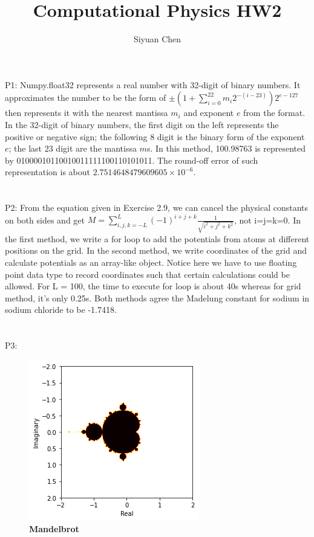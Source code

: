 \documentclass[11pt]{article}
\title{Computational Physics HW2}
\author{Siyuan Chen}
\begin{document}
\maketitle

\section*{}
P1:
Numpy.float32 represents a real number with 32-digit of binary numbers. It approximates the number to be the form of $\pm(1+\sum\limits^{22}_{i=0}m_i2^{-(i-23)})2^{e-127}$ then represents it with the nearest mantissa $m_i$ and exponent $e$ from the format. In the 32-digit of binary numbers, the first digit on the left represents the positive or negative sign; the following 8 digit is the binary form of the exponent $e$; the last 23 digit are the mantissa $m$s. In this method, 100.98763 is represented by 01000010110010011111100110101011. The round-off error of such representation is about $2.7514648479609605\times10^{-6}$.

\section*{}
P2:
From the equation given in Exercise 2.9, we can cancel the physical constants on both sides and get $M=\sum\limits^L_{i,j,k=-L}(-1)^{i+j+k}\frac{1}{\sqrt{i^2+j^2+k^2}}$, not i=j=k=0. In the first method, we write a for loop to add the potentials from atoms at different positions on the grid. In the second method, we write coordinates of the grid and calculate potentials as an array-like object. Notice here we have to use floating point data type to record coordinates such that certain calculations could be allowed. For L = 100, the time to execute for loop is about 40s whereas for grid method, it's only 0.25s. Both methods agree the Madelung constant for sodium in sodium chloride to be -1.7418.

\section*{}
P3:

\begin{figure}
    \includegraphics{Mandelbrot.png}
    \caption{\textbf{Mandelbrot} 
    }
    \label{fig}
\end{figure}
\end{document}

